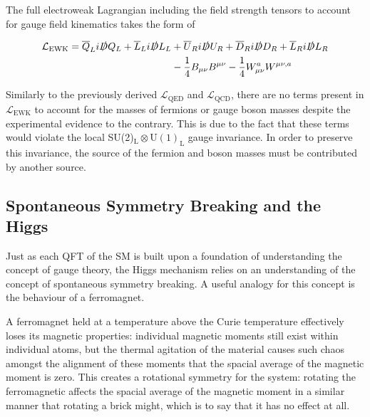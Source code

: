 \documentclass[12pt,a4paper,epsf,portrait,times,epsfig]{report}
\begin{document}
	The full electroweak Lagrangian including the field strength tensors to account for gauge field kinematics takes the form of

	\begin{equation}
		\begin{split}
		\mathcal{L}_{\mathrm{EWK}}=\overline{Q}_{L}i\slashed{D}Q_{L}+\overline{L}_{L}i\slashed{D}L_{L} &+ \overline{U}_{R}i\slashed{D}U_{R}+\overline{D}_{R}i\slashed{D}D_{R}+\overline{L}_{R}i\slashed{D}L_{R}\\
		&- \frac{1}{4}B_{\mu\nu}B^{\mu\nu}-\frac{1}{4}W_{\mu\nu}^{a}W^{\mu\nu,a}\\
		\end{split}
	\end{equation}

	Similarly to the previously derived $\mathcal{L}_{\mathrm{QED}}$ and $\mathcal{L}_{\mathrm{QCD}}$, there are no terms present in $\mathcal{L}_{\mathrm{EWK}}$ to account for the masses of fermions or gauge boson masses despite the experimental evidence to the contrary. This is due to the fact that these terms would violate the local SU(2)$_{\mathrm{L}} \otimes \mathrm{U(1)}_{\mathrm{L}}$ gauge invariance. In order to preserve this invariance, the source of the fermion and boson masses must be contributed by another source. 

	\subsection{Spontaneous Symmetry Breaking and the Higgs}


	Just as each QFT of the SM is built upon a foundation of understanding the concept of gauge theory, the Higgs mechanism relies on an understanding of the concept of spontaneous symmetry breaking. A useful analogy for this concept is the behaviour of a ferromagnet. \par

	A ferromagnet held at a temperature above the Curie temperature effectively loses its magnetic properties: individual magnetic moments still exist within individual atoms, but the thermal agitation of the material causes such chaos amongst the alignment of these moments that the spacial average of the magnetic moment is zero. This creates a rotational symmetry for the system: rotating the ferromagnetic affects the spacial average of the magnetic moment in a similar manner that rotating a brick might, which is to say that it has no effect at all. \par
	
\end{document}
